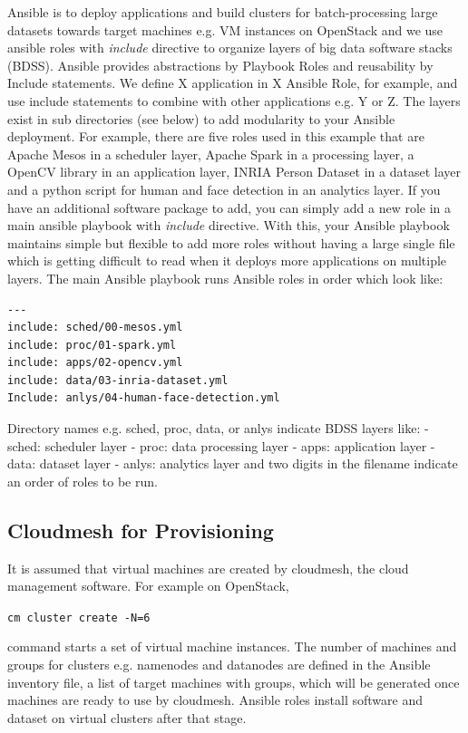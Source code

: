 Ansible is to deploy applications and build clusters for
batch-processing large datasets towards target machines e.g. VM
instances on OpenStack and we use ansible roles with \emph{include}
directive to organize layers of big data software stacks (BDSS). Ansible
provides abstractions by Playbook Roles and reusability by Include
statements. We define X application in X Ansible Role, for example, and
use include statements to combine with other applications e.g. Y or Z.
The layers exist in sub directories (see below) to add modularity to
your Ansible deployment. For example, there are five roles used in this
example that are Apache Mesos in a scheduler layer, Apache Spark in a
processing layer, a OpenCV library in an application layer, INRIA Person
Dataset in a dataset layer and a python script for human and face
detection in an analytics layer. If you have an additional software
package to add, you can simply add a new role in a main ansible playbook
with \emph{include} directive. With this, your Ansible playbook
maintains simple but flexible to add more roles without having a large
single file which is getting difficult to read when it deploys more
applications on multiple layers. The main Ansible playbook runs Ansible
roles in order which look like:

\begin{verbatim}
---
include: sched/00-mesos.yml
include: proc/01-spark.yml
include: apps/02-opencv.yml
include: data/03-inria-dataset.yml
Include: anlys/04-human-face-detection.yml
\end{verbatim}

Directory names e.g. sched, proc, data, or anlys indicate BDSS layers
like: - sched: scheduler layer - proc: data processing layer - apps:
application layer - data: dataset layer - anlys: analytics layer and two
digits in the filename indicate an order of roles to be run.

\subsection{Cloudmesh for
Provisioning}\label{cloudmesh-for-provisioning}

It is assumed that virtual machines are created by cloudmesh, the cloud
management software. For example on OpenStack,

\texttt{cm\ cluster\ create\ -N=6}

command starts a set of virtual machine instances. The number of
machines and groups for clusters e.g. namenodes and datanodes are
defined in the Ansible inventory file, a list of target machines with
groups, which will be generated once machines are ready to use by
cloudmesh. Ansible roles install software and dataset on virtual
clusters after that stage.

